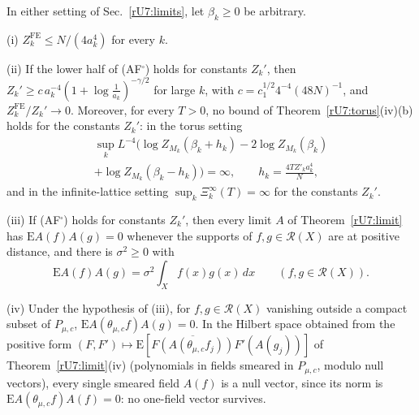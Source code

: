 \begin{theorem}\label{rU7:afthm}
In either setting of Sec.~\ref{rU7:limits}, let $\beta_k\ge0$ be arbitrary.

\textup{(i)} $Z^{\mathrm{FE}}_k\le N/(4a_k^4)$ for every $k$.

\textup{(ii)} If the lower half of \textup{(AF$^\square$)} holds for constants
$Z_k'$, then $Z_k'\ge c\,a_k^{-4}(1+\log\frac1{a_k})^{-\gamma/2}$ for large $k$,
with $c=c_1^{1/2}4^{-4}(48N)^{-1}$, and $Z^{\mathrm{FE}}_k/Z_k'\to0$. Moreover,
for every $T>0$, no bound of Theorem~\textup{\ref{rU7:torus}(iv)(b)} holds for
the constants $Z_k'$: in the torus setting
\begin{gather*}
\sup_kL^{-4}\bigl(\log Z_{M_k}(\beta_k+h_k)-2\log Z_{M_k}(\beta_k)\\
+\log Z_{M_k}(\beta_k-h_k)\bigr)=\infty,\qquad
h_k=\frac{4TZ'_ka_k^4}N ,
\end{gather*}
and in the infinite-lattice setting $\sup_k\Xi^\infty_k(T)=\infty$ for the
constants $Z_k'$.

\textup{(iii)} If \textup{(AF$^\square$)} holds for constants $Z_k'$, then every
limit $A$ of Theorem~\textup{\ref{rU7:limit}} has $\mathrm EA(f)A(g)=0$ whenever
the supports of $f,g\in\mathcal R(X)$ are at positive distance, and there is
$\sigma^2\ge0$ with
\[
\mathrm EA(f)A(g)=\sigma^2\int_Xf(x)g(x)\,dx\qquad(f,g\in\mathcal R(X)).
\]

\textup{(iv)} Under the hypothesis of \textup{(iii)}, for $f,g\in\mathcal R(X)$
vanishing outside a compact subset of $P_{\mu,c}$,
$\mathrm EA(\theta_{\mu,c}f)A(g)=0$. In the Hilbert space obtained from the
positive form $(F,F')\mapsto\mathrm E[\overline{F(A(\theta_{\mu,c}f_j))}F'(A(
g_j))]$ of Theorem~\textup{\ref{rU7:limit}(iv)} (polynomials in fields
smeared in $P_{\mu,c}$, modulo null vectors), every single smeared field
$A(f)$ is a null vector, since its norm is $\mathrm EA(\theta_{\mu,c}f)A(f)
=0$: no one-field vector survives.
\end{theorem}

